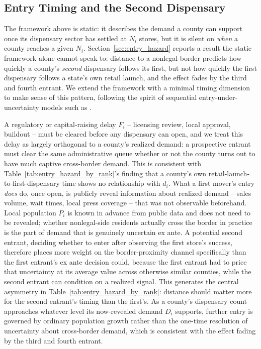 \documentclass[12pt]{article}
\begin{document}
\subsection{Entry Timing and the Second Dispensary}
\label{sec:model_timing}

The framework above is static: it describes the demand a county can support once its dispensary sector has
settled at $N_i$ stores, but it is silent on \emph{when} a county reaches a given $N_i$. Section~\ref{sec:entry_hazard}
reports a result the static framework alone cannot speak to: distance to a nonlegal border predicts how
quickly a county's \emph{second} dispensary follows its first, but not how quickly the first dispensary
follows a state's own retail launch, and the effect fades by the third and fourth entrant. We extend the
framework with a minimal timing dimension to make sense of this pattern, following the spirit of sequential
entry-under-uncertainty models such as \citet{PrescottVisscher1977}.

A regulatory or capital-raising delay $F_i$ -- licensing review, local approval, buildout -- must be cleared
before any dispensary can open, and we treat this delay as largely orthogonal to a county's realized demand:
a prospective entrant must clear the same administrative queue whether or not the county turns out to have
much captive cross-border demand. This is consistent with Table~\ref{tab:entry_hazard_by_rank}'s finding
that a county's own retail-launch-to-first-dispensary time shows no relationship with $d_i$. What a first
mover's entry \emph{does} do, once open, is publicly reveal information about realized demand -- sales
volume, wait times, local press coverage -- that was not observable beforehand. Local population $P_i$ is
known in advance from public data and does not need to be revealed; whether nonlegal-side residents actually
cross the border in practice is the part of demand that is genuinely uncertain ex ante. A potential second
entrant, deciding whether to enter after observing the first store's success, therefore places more weight
on the border-proximity channel specifically than the first entrant's ex ante decision could, because the
first entrant had to price that uncertainty at its average value across otherwise similar counties, while
the second entrant can condition on a realized signal. This generates the central asymmetry in
Table~\ref{tab:entry_hazard_by_rank}: distance should matter more for the second entrant's timing than the
first's. As a county's dispensary count approaches whatever level its now-revealed demand $D_i$ supports,
further entry is governed by ordinary population growth rather than the one-time resolution of uncertainty
about cross-border demand, which is consistent with the effect fading by the third and fourth entrant.
\end{document}
